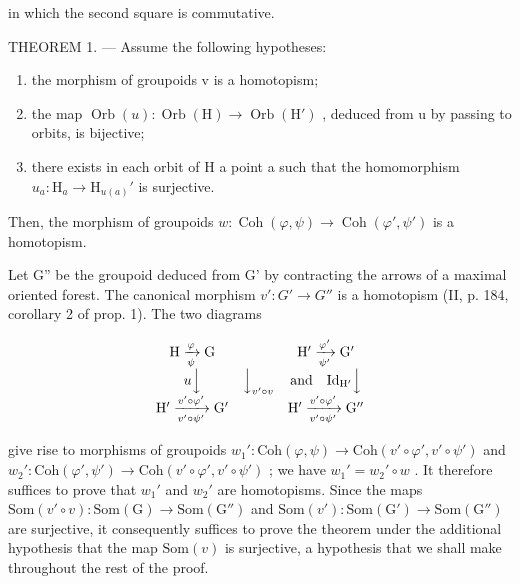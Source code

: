 in which the second square is commutative.

THEOREM 1. --- Assume the following hypotheses:

\begin{enumerate}
\def\labelenumi{(\roman{enumi})}
\item
  the morphism of groupoids v is a homotopism;
\item
  the map \(\operatorname{Orb}(u)\colon\operatorname{Orb}(\mathrm{H})\to\operatorname{Orb}(\mathrm{H}')\) , deduced from u by passing to orbits, is bijective;
\item
  there exists in each orbit of H a point a such that the homomorphism \(u_a \colon \mathrm{H}_a \to \mathrm{H}_{u(a)}'\) is surjective.
\end{enumerate}

Then, the morphism of groupoids \(w\colon \operatorname{Coh}(\varphi,\psi)\to\operatorname{Coh}(\varphi',\psi')\) is a homotopism.

Let G'' be the groupoid deduced from G' by contracting the arrows of a maximal oriented forest. The canonical morphism \(v'\colon G' \to G''\) is a homotopism (II, p. 184, corollary 2 of prop. 1). The two diagrams

\[
\begin{array}{c c c} \mathrm{H} \xrightarrow [ \psi ]{\varphi} \mathrm{G} & & \mathrm{H} ^ {\prime} \xrightarrow [ \psi^ {\prime} ]{\varphi^ {\prime}} \mathrm{G} ^ {\prime} \\ u \Big \downarrow & \Big \downarrow_ {v ^ {\prime} \circ v} & \text {and} \quad \mathrm{Id} _ {\mathrm{H} ^ {\prime}} \Big \downarrow \\ \mathrm{H} ^ {\prime} \xrightarrow [ v ^ {\prime} \circ \psi^ {\prime} ]{v ^ {\prime} \circ \varphi^ {\prime}} \mathrm{G} ^ {\prime} & & \mathrm{H} ^ {\prime} \xrightarrow [ v ^ {\prime} \circ \psi^ {\prime} ]{v ^ {\prime} \circ \varphi^ {\prime}} \mathrm{G} ^ {\prime \prime} \end{array}
\]

give rise to morphisms of groupoids \(w_1' \colon \mathrm{Coh}(\varphi, \psi) \to \mathrm{Coh}(v' \circ \varphi', v' \circ \psi')\) and \(w_2' \colon \mathrm{Coh}(\varphi', \psi') \to \mathrm{Coh}(v' \circ \varphi', v' \circ \psi')\) ; we have \(w_1' = w_2' \circ w\) . It therefore suffices to prove that \(w_1'\) and \(w_2'\) are homotopisms. Since the maps \(\mathrm{Som}(v' \circ v) \colon \mathrm{Som}(\mathrm{G}) \to \mathrm{Som}(\mathrm{G}'' )\) and \(\mathrm{Som}(v') \colon \mathrm{Som}(\mathrm{G}') \to \mathrm{Som}(\mathrm{G}'' )\) are surjective, it consequently suffices to prove the theorem under the additional hypothesis that the map \(\mathrm{Som}(v)\) is surjective, a hypothesis that we shall make throughout the rest of the proof.

